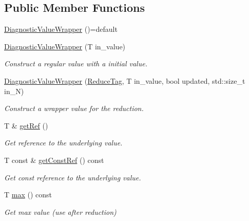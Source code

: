 \subsection*{Public Member Functions}
\begin{DoxyCompactItemize}
\item 
\hyperlink{structvt_1_1runtime_1_1component_1_1detail_1_1_diagnostic_value_wrapper_a23a27702c3d6bc7d676b68751b1650fd}{Diagnostic\+Value\+Wrapper} ()=default
\item 
\hyperlink{structvt_1_1runtime_1_1component_1_1detail_1_1_diagnostic_value_wrapper_a7e965609e41ed71e784e0f0e94f64cef}{Diagnostic\+Value\+Wrapper} (T in\+\_\+value)
\begin{DoxyCompactList}\small\item\em Construct a regular value with a initial value. \end{DoxyCompactList}\item 
\hyperlink{structvt_1_1runtime_1_1component_1_1detail_1_1_diagnostic_value_wrapper_a360abef35b84df7ed4ca90d72541153e}{Diagnostic\+Value\+Wrapper} (\hyperlink{structvt_1_1runtime_1_1component_1_1detail_1_1_diagnostic_value_wrapper_1_1_reduce_tag}{Reduce\+Tag}, T in\+\_\+value, bool updated, std\+::size\+\_\+t in\+\_\+N)
\begin{DoxyCompactList}\small\item\em Construct a wrapper value for the reduction. \end{DoxyCompactList}\item 
T \& \hyperlink{structvt_1_1runtime_1_1component_1_1detail_1_1_diagnostic_value_wrapper_a923c17aaddcacbfe3444d663dd69837c}{get\+Ref} ()
\begin{DoxyCompactList}\small\item\em Get reference to the underlying value. \end{DoxyCompactList}\item 
T const  \& \hyperlink{structvt_1_1runtime_1_1component_1_1detail_1_1_diagnostic_value_wrapper_a99bc2ce5cfe79d68a02f59b185d9f7cf}{get\+Const\+Ref} () const
\begin{DoxyCompactList}\small\item\em Get const reference to the underlying value. \end{DoxyCompactList}\item 
T \hyperlink{structvt_1_1runtime_1_1component_1_1detail_1_1_diagnostic_value_wrapper_a366f9b83f55552c1b02f03c0fb65e72a}{max} () const
\begin{DoxyCompactList}\small\item\em Get max value (use after reduction) \end{DoxyCompactList}\item 

\end{DoxyCompactItemize}
